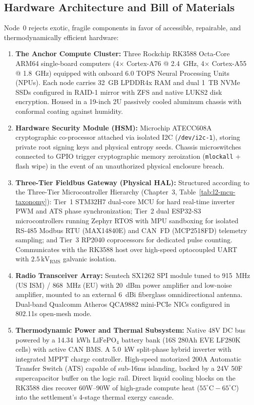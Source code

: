 \subsection{Hardware Architecture and Bill of Materials}
\label{subsec:hardware_bom}

Node~0 rejects exotic, fragile components in favor of accessible, repairable, and thermodynamically efficient hardware:

\begin{enumerate}
    \item \textbf{The Anchor Compute Cluster:} Three Rockchip RK3588 Octa-Core ARM64 single-board computers (4$\times$ Cortex-A76 @ 2.4~GHz, 4$\times$ Cortex-A55 @ 1.8~GHz) equipped with onboard 6.0 TOPS Neural Processing Units (NPUs). Each node carries 32~GB LPDDR4x RAM and dual 1~TB NVMe SSDs configured in RAID-1 mirror with ZFS and native LUKS2 disk encryption. Housed in a 19-inch 2U passively cooled aluminum chassis with conformal coating against humidity.
    \item \textbf{Hardware Security Module (HSM):} Microchip ATECC608A cryptographic co-processor attached via isolated I2C (\texttt{/dev/i2c-1}), storing private root signing keys and physical entropy seeds. Chassis microswitches connected to GPIO trigger cryptographic memory zeroization (\texttt{mlockall} + flash wipe) in the event of an unauthorized physical enclosure breach.
    \item \textbf{Three-Tier Fieldbus Gateway (Physical HAL):} Structured according to the Three-Tier Microcontroller Hierarchy (Chapter~3, Table~\ref{tab:l2-mcu-taxonomy}): Tier~1 STM32H7 dual-core MCU for hard real-time inverter PWM and ATS phase synchronization; Tier~2 dual ESP32-S3 microcontrollers running Zephyr RTOS with MPU sandboxing for isolated RS-485 Modbus RTU (MAX14840E) and CAN~FD (MCP2518FD) telemetry sampling; and Tier~3 RP2040 coprocessors for dedicated pulse counting. Communicates with the RK3588 host over high-speed optocoupled UART with $2.5\,\mathrm{kV}_{\mathrm{RMS}}$ galvanic isolation.
    \item \textbf{Radio Transceiver Array:} Semtech SX1262 SPI module tuned to 915~MHz (US ISM) / 868~MHz (EU) with 20~dBm power amplifier and low-noise amplifier, mounted to an external 6~dBi fiberglass omnidirectional antenna. Dual-band Qualcomm Atheros QCA9882 mini-PCIe NICs configured in 802.11s open-mesh mode.
    \item \textbf{Thermodynamic Power and Thermal Subsystem:} Native 48V DC bus powered by a 14.34~kWh $\mathrm{LiFePO}_4$ battery bank (16S 280Ah EVE LF280K cells) with active CAN BMS. A 5.0~kW split-phase hybrid inverter with integrated MPPT charge controller. High-speed motorized 200A Automatic Transfer Switch (ATS) capable of sub-16ms islanding, backed by a 24V 50F supercapacitor buffer on the logic rail. Direct liquid cooling blocks on the RK3588 dies recover 60W--90W of high-grade compute heat ($55^\circ\mathrm{C}-65^\circ\mathrm{C}$) into the settlement's 4-stage thermal exergy cascade.
\end{enumerate}

